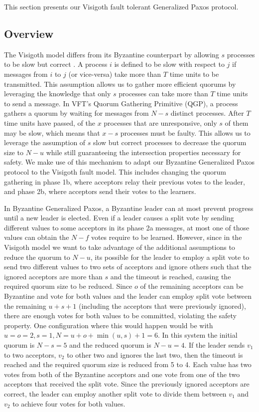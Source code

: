 This section presents our Visigoth fault tolerant Generalized Paxos protocol. 
\subsection{Overview}

The Visigoth model differs from its Byzantine counterpart by allowing $s$ processes to be slow but correct \cite{}. A process $i$ is defined to be slow with respect to $j$ if messages from $i$ to $j$ (or vice-versa) take more than $T$ time units to be transmitted. This assumption allows us to gather more efficient quorums by leveraging the knowledge that only $s$ processes can take more than $T$ time units to send a message. In VFT's Quorum Gathering Primitive (QGP), a process gathers a quorum by waiting for messages from $N-s$ distinct processes. After $T$ time units have passed, of the $x$ processes that are unresponsive, only $s$ of them may be slow, which means that $x-s$ processes must be faulty. This allows us to leverage the assumption of $s$ slow but correct processes to decrease the quorum size to $N-u$ while still guaranteeing the intersection properties necessary for safety. We make use of this mechanism to adapt our Byzantine Generalized Paxos protocol to the Visigoth fault model. This includes changing the quorum gathering in phase 1b, where acceptors relay their previous votes to the leader, and phase 2b, where acceptors send their votes to the learners. \par
In Byzantine Generalized Paxos, a Byzantine leader can at most prevent progress until a new leader is elected. Even if a leader causes a split vote by sending different values to some acceptors in its phase 2a messages, at most one of those values can obtain the $N-f$ votes require to be learned. However, since in the Visigoth model we want to take advantage of the additional assumptions to reduce the quorum to $N-u$, its possible for the leader to employ a split vote to send two different values to two sets of acceptors and ignore others such that the ignored acceptors are more than $s$ and the timeout is reached, causing the required quorum size to be reduced. Since $o$ of the remaining acceptors can be Byzantine and vote for both values and the leader can employ split vote between the remaining $u+s+1$ (including the acceptors that were previously ignored), there are enough votes for both values to be committed, violating the safety property. One configuration where this would happen would be with $u=o=2, s=1, N=u+o+\min(u,s)+1=6$. In this system the initial quorum is $N-s=5$ and the reduced quorum is $N-u=4$. If the leader sends $v_1$ to two acceptors, $v_2$ to other two and ignores the last two, then the timeout is reached and the required quorum size is reduced from 5 to 4. Each value has two votes from both of the Byzantine acceptors and one vote from one of the two acceptors that received the split vote. Since the previously ignored acceptors are correct, the leader can employ another split vote to divide them between $v_1$ and $v_2$ to achieve four votes for both values. \par
